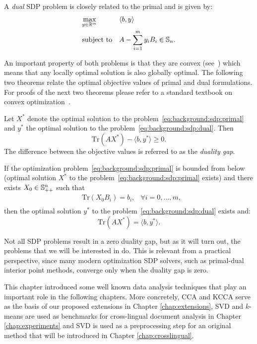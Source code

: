 A \emph{dual} SDP problem is closely related to the primal and is given by:
\begin{equation}\label{eq:background:sdp:dual}
\begin{aligned}
& \underset{y \in \mathbb{R}^m}{\text{max}}
& &  \langle b, y \rangle \\
& \text{subject to}
& &  A - \sum_{i=1}^m y_i B_i \in \mathbb{S}_n.\\
\end{aligned}
\end{equation}

An important property of both problems is that they are convex (see~\cite{Boyd:2004:CO:993483}) which
means that any locally optimal solution is also globally optimal.
The following two theorems relate the optimal objective values of primal and dual formulations. For proofs
of the next two theorems please refer to a standard textbook on convex optimization~\cite{Boyd:2004:CO:993483}.

\begin{theorem}\label{thm:background:sdp_weak}
Let $X^*$ denote the optimal solution to the problem~\ref{eq:background:sdp:primal} and $y^*$ the optimal
solution to the problem~\ref{eq:background:sdp:dual}. Then
$$ \mathrm{Tr}(A X^*) - \langle b, y^* \rangle \geq 0.$$
The difference between the objective values is referred to as the \emph{duality gap}.
\end{theorem}

\begin{theorem}\label{thm:background:sdp_strong}
If the optimization problem~\ref{eq:background:sdp:primal} is bounded from below 
(optimal solution $X^*$ to the problem~\ref{eq:background:sdp:primal} exists) and there exists $X_0 \in \mathbb{S}_{++}^n$
such that 
\begin{equation}
\begin{aligned}
& \mathrm{Tr}(X_0 B_i) = b_i, & \forall i = 0,\ldots,m, \\
\end{aligned}
\end{equation}
then the optimal solution $y^*$ to the problem~\ref{eq:background:sdp:dual} exists and:
$$ \mathrm{Tr}(A X^*) = \langle b, y^* \rangle.$$
\end{theorem}

Not all SDP problems result in a zero duality gap, but as it will turn out, the problems that we will be interested in do. This
is relevant from a practical perspective, since many modern optimization SDP solvers,
such as primal-dual interior point methods, converge only when the duality gap is zero.

\vspace{5mm}
This chapter introduced some well known data analysis techniques that play an important role in the following chapters. More concretely, CCA and KCCA
serve as the basis of our proposed extensions in Chapter \ref{chap:extensions}, SVD and $k$-means are used as benchmarks for cross-lingual document
analysis in Chapter \ref{chap:experiments} and SVD is used as a preprocessing step for an original method that will be introduced in Chapter \ref{chap:crosslingual}.

